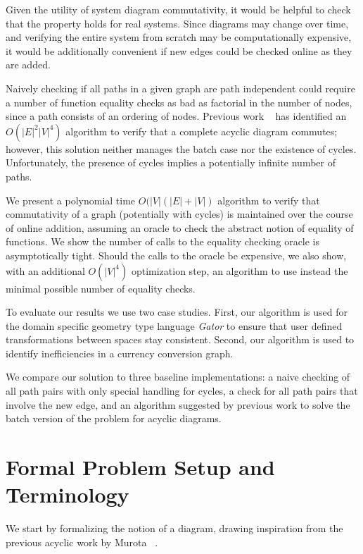 \documentclass[sigplan,review,anonymous]{acmart}
\begin{document}
Given the utility of system diagram commutativity, it would be helpful to check that the property holds for real systems.
Since diagrams may change over time, and verifying the entire system from scratch may be computationally expensive, it would be additionally convenient if new edges could be checked online as they are added.

Naively checking if all paths in a given graph are path independent could require a number of function equality checks as bad as factorial in the number of nodes, since a path consists of an ordering of nodes. Previous work ~\cite{commutative} has identified an $O(|E|^2|V|^4)$ algorithm to verify that a complete acyclic diagram commutes; however, this solution neither manages the batch case nor the existence of cycles. Unfortunately, the presence of cycles implies a potentially infinite number of paths. 

We present a polynomial time $O(|V|(|E|+|V|)$ algorithm to verify that commutativity of a graph (potentially with cycles) is maintained over the course of online addition, assuming an oracle to check the abstract notion of equality of functions. We show the number of calls to the equality checking oracle is asymptotically tight. Should the calls to the oracle be expensive, we also show, with an additional $O(|V|^4)$ optimization step, an algorithm to use instead the minimal possible number of equality checks.

To evaluate our results we use two case studies.
First, our algorithm is used for the domain specific geometry type language \textit{Gator} to ensure that user defined transformations between spaces stay consistent. Second, our algorithm is used to identify inefficiencies in a currency conversion graph.

We compare our solution to three baseline implementations: a naive checking of all path pairs with only special handling for cycles, a check for all path pairs that involve the new edge, and an algorithm suggested by previous work to solve the batch version of the problem for acyclic diagrams.

\section{Formal Problem Setup and Terminology}

We start by formalizing the notion of a diagram, drawing inspiration from the previous acyclic work by Murota ~\cite{commutative}.

\end{document}
